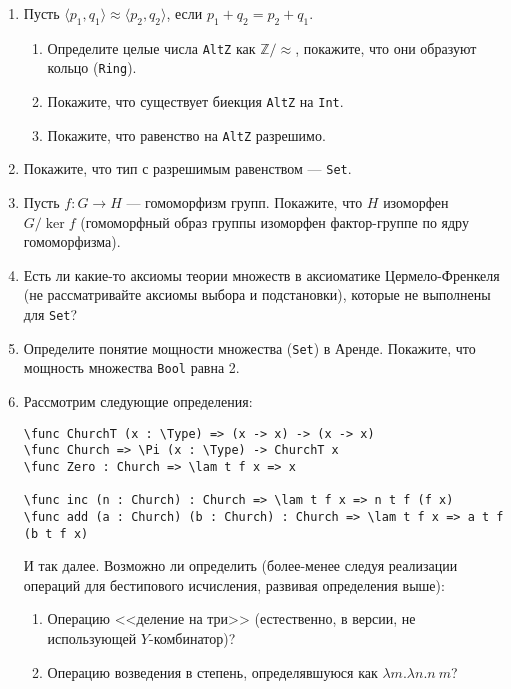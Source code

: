 \documentclass[10pt,a4paper,oneside]{article}
\begin{document}
\begin{enumerate}
\item Пусть $\langle p_1,q_1 \rangle \approx \langle p_2,q_2 \rangle$, если $p_1 + q_2 = p_2 + q_1$.
\begin{enumerate}
\item Определите целые числа \verb!AltZ! как $\mathbb{Z}/\approx$, покажите, что они образуют кольцо (\verb!Ring!). 
\item Покажите, что существует биекция \verb!AltZ! на \verb!Int!.
\item Покажите, что равенство на \verb!AltZ! разрешимо.
\end{enumerate}
\item Покажите, что тип с разрешимым равенством --- \verb!Set!.
\item Пусть $f : G \rightarrow H$ --- гомоморфизм групп. Покажите, что $H$ изоморфен $G/\ker f$ (гомоморфный образ группы
изоморфен фактор-группе по ядру гомоморфизма).
\item Есть ли какие-то аксиомы теории множеств в аксиоматике Цермело-Френкеля (не рассматривайте аксиомы выбора и подстановки), 
которые не выполнены для \verb!Set!?
\item Определите понятие мощности множества (\verb!Set!) в Аренде. Покажите, что мощность множества \verb!Bool! равна 2.
\item Рассмотрим следующие определения:
\begin{verbatim}
\func ChurchT (x : \Type) => (x -> x) -> (x -> x)
\func Church => \Pi (x : \Type) -> ChurchT x
\func Zero : Church => \lam t f x => x

\func inc (n : Church) : Church => \lam t f x => n t f (f x)
\func add (a : Church) (b : Church) : Church => \lam t f x => a t f (b t f x)
\end{verbatim}

И так далее. Возможно ли определить (более-менее следуя реализации операций для бестипового исчисления,
развивая определения выше):
\begin{enumerate}
\item Операцию <<деление на три>> (естественно, в версии, не использующей $Y$-комбинатор)?
\item Операцию возведения в степень, определявшуюся как $\lambda m.\lambda n.n\ m$?
\end{enumerate}
\end{enumerate}
\end{document}
